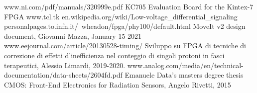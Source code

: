 \begin{thebibliography}{00}
	www.ni.com/pdf/manuals/320999e.pdf
	KC705 Evaluation Board for the Kintex-7 FPGA	
	www.tcl.tk
	en.wikipedia.org/wiki/Low-voltage\_differential\_signaling
	personalpages.to.infn.it/~wheadon/fpga/phy100/default.html
	MoveIt v2 design document, Giovanni Mazza, January 15 2021
	www.eejournal.com/article/20130528-timing/
	Sviluppo su FPGA di tecniche di correzione di effetti d'inefficienza nel conteggio di singoli protoni in fasci terapeutici, Alessio Limardi, 2019-2020.
	www.analog.com/media/en/technical-documentation/data-sheets/2604fd.pdf
	Emanuele Data's masters degree thesis
	 CMOS: Front-End Electronics for Radiation Sensors, Angelo Rivetti, 2015
	
	
\end{thebibliography}

